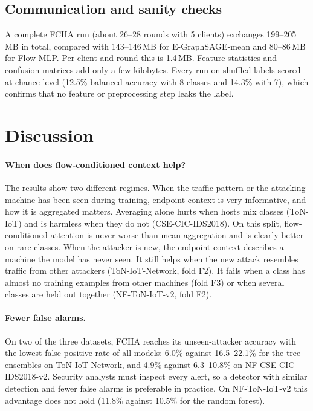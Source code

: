 \documentclass[pdflatex,sn-mathphys-num]{sn-jnl}
\begin{document}
\subsection{Communication and sanity checks}\label{sec:res-comm}

A complete FCHA run (about 26--28 rounds with 5 clients) exchanges 199--205\,MB in total, compared with 143--146\,MB for E-GraphSAGE-mean and 80--86\,MB for Flow-MLP. Per client and round this is 1.4\,MB. Feature statistics and confusion matrices add only a few kilobytes. Every run on shuffled labels scored at chance level (12.5\% balanced accuracy with 8 classes and 14.3\% with 7), which confirms that no feature or preprocessing step leaks the label.

\section{Discussion}\label{sec:discussion}

\paragraph{When does flow-conditioned context help?} The results show two different regimes. When the traffic pattern or the attacking machine has been seen during training, endpoint context is very informative, and how it is aggregated matters. Averaging alone hurts when hosts mix classes (ToN-IoT) and is harmless when they do not (CSE-CIC-IDS2018). On this split, flow-conditioned attention is never worse than mean aggregation and is clearly better on rare classes. When the attacker is new, the endpoint context describes a machine the model has never seen. It still helps when the new attack resembles traffic from other attackers (ToN-IoT-Network, fold F2). It fails when a class has almost no training examples from other machines (fold F3) or when several classes are held out together (NF-ToN-IoT-v2, fold F2).

\paragraph{Fewer false alarms.} On two of the three datasets, FCHA reaches its unseen-attacker accuracy with the lowest false-positive rate of all models: 6.0\% against 16.5--22.1\% for the tree ensembles on ToN-IoT-Network, and 4.9\% against 6.3--10.8\% on NF-CSE-CIC-IDS2018-v2. Security analysts must inspect every alert, so a detector with similar detection and fewer false alarms is preferable in practice. On NF-ToN-IoT-v2 this advantage does not hold (11.8\% against 10.5\% for the random forest).
\end{document}
